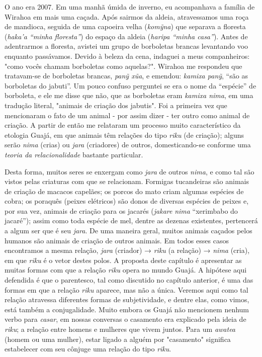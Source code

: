 \noindent O ano era 2007. Em uma manhã úmida de inverno, eu acompanhava a família
de Wirahoa em mais uma caçada. Após sairmos da aldeia, atravessamos uma
roça de mandioca, seguida de uma capoeira velha (\emph{komỹna}) que
separava a floresta (\emph{haka'a ``minha floresta''}) do espaço da
aldeia (\emph{haripa ``minha casa''}). Antes de adentrarmos a floresta,
avistei um grupo de borboletas brancas levantando voo enquanto
passávamos. Devido à beleza da cena, indaguei a meus companheiros: "como
vocês chamam borboletas como aquelas?". Wirahoa me respondeu que
tratavam-se de borboletas brancas, \emph{panỹ xũa}, e emendou:
\emph{kamixa panỹ}, ``são as borboletas do jabuti''. Um pouco confuso
perguntei se era o nome da ``espécie'' de borboleta, e ele me disse que
não, que as borboletas eram \emph{kamixa nima}, em uma tradução literal,
"animais de criação dos jabutis". Foi a primeira vez que mencionaram o
fato de um animal - por assim dizer - ter outro como animal de criação.
A partir de então me relataram um processo muito característico da
etologia Guajá, em que animais têm relações do tipo \emph{riku} (de
criação); alguns serão \emph{nima} (crias) ou \emph{jara} (criadores) de
outros, domesticando-se conforme uma \emph{teoria da relacionalidade}
bastante particular.

Desta forma, muitos seres se enxergam como \emph{jara} de outros
\emph{nima}, e como tal são vistos pelas criaturas com que se
relacionam. Formigas tucandeiras são animais de criação de macacos
capelães; os porcos do mato criam algumas espécies de cobra; os poraquês
(peixes elétricos) são donos de diversas espécies de peixes e, por sua
vez, animais de criação para os jacarés (\emph{jakare} \emph{nima}
``xerimbabo do jacaré''); assim como toda espécie de mel, dentre as
dezenas existentes, pertencerá a algum ser que é seu \emph{jara}. De uma
maneira geral, muitos animais caçados pelos humanos são animais de
criação de outros animais. Em todos esses casos encontramos a mesma
relação, \emph{jara} (criador) → \emph{riku} (a relação) → \emph{nima}
(cria), em que \emph{riku} é o vetor destes polos. A proposta deste
capítulo é apresentar as muitas formas com que a relação \emph{riku}
opera no mundo Guajá. A hipótese aqui defendida é que o parentesco, tal
como discutido no capítulo anterior, é uma das formas em que a relação
\emph{riku} aparece, mas não a única. Veremos aqui como tal relação
atravessa diferentes formas de subjetividade, e dentre elas, como vimos,
está também a conjugalidade. Muito embora os Guajá não mencionem nenhum
verbo para \emph{casar}, em nossas conversas o casamento era explicado
pela ideia de \emph{riku}; a relação entre homens e mulheres que vivem
juntos. Para um \emph{awatea} (homem ou uma mulher), estar ligado a
alguém por "casamento" significa estabelecer com seu cônjuge uma relação
do tipo \emph{riku}.

